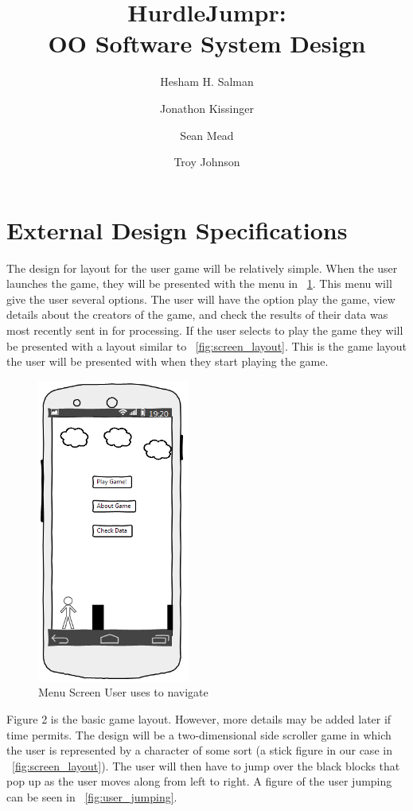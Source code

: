 \documentclass[a4wide]{article}
\title{HurdleJumpr:\\ OO Software System Design}
\author{Hesham H. Salman \and Jonathon Kissinger \and Sean Mead \and Troy Johnson}
\begin{document}
\maketitle

\section{External Design Specifications}
The design for layout for the user game will be relatively simple. When the user launches the game, they will be presented with the menu in ~\ref{fig:intro_image}. This menu will give the user several options. The user will have the option play the game, view details about the creators of the game, and check the results of their data was most recently sent in for processing. If the user selects to play the game they will be presented with a layout similar to ~\ref{fig:screen_layout}. This is the game layout the user will be presented with when they start playing the game.

\begin{figure}[H]
\centering
\includegraphics[height=10cm, width = 5cm]{images/intro.png}
\caption{Menu Screen User uses to navigate}
\label{fig:intro_image}
\end{figure}

 Figure 2 is the basic game layout. However, more details may be added later if time permits. The design will be a two-dimensional side scroller game in which the user is represented by a character of some sort (a stick figure in our case in ~\ref{fig:screen_layout}). The user will then have to jump over the black blocks that pop up as the user moves along from left to right. A figure of the user jumping can be seen in ~\ref{fig:user_jumping}.
\end{document}
